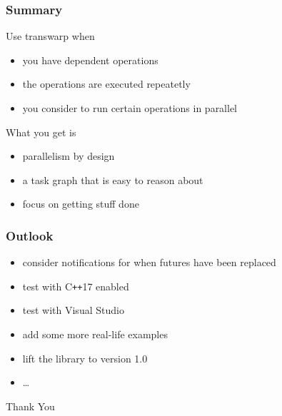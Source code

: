 \documentclass[11pt]{beamer}
\begin{document}
\begin{frame}[fragile]
\frametitle{Summary}

Use transwarp when
\begin{itemize}
\itemsep .5em
\item you have dependent operations
\item the operations are executed repeatetly
\item you consider to run certain operations in parallel
\end{itemize}

\bigskip
\bigskip

What you get is
\begin{itemize}
\itemsep .5em
\item parallelism by design
\item a task graph that is easy to reason about
\item focus on getting stuff done
\end{itemize}

\end{frame}


\begin{frame}[fragile]
\frametitle{Outlook}

\begin{itemize}
\itemsep 1em
\item consider notifications for when futures have been replaced
\item test with C\texttt{++}17 enabled
\item test with Visual Studio
\item add some more real-life examples
\item lift the library to version 1.0
\item \dots
\end{itemize}

\end{frame}


\begin{frame}[fragile]
\huge
Thank You
\end{frame}
\end{document}
